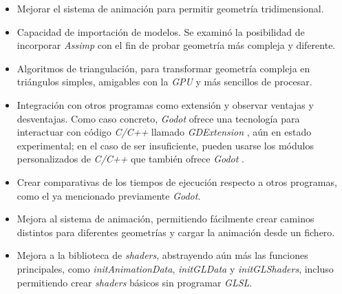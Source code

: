 \begin{itemize}

    \item Mejorar el sistema de animación para permitir geometría tridimensional.

    \item Capacidad de importación de modelos. Se examinó la posibilidad de incorporar \textit{Assimp} con el fin de probar geometría más compleja y diferente.

    \item Algoritmos de triangulación, para transformar geometría compleja en triángulos simples, amigables con la \textit{GPU} y más sencillos de procesar.

    \item Integración con otros programas como extensión y observar ventajas y desventajas. Como caso concreto, \textit{Godot} ofrece una tecnología para interactuar con código \textit{C/C++} llamado \textit{GDExtension} \cite{webGodotGDExtension}, aún en estado experimental; en el caso de ser insuficiente, pueden usarse los módulos personalizados de \textit{C/C++} que también ofrece \textit{Godot} \cite{webGodotCModules}.

    \item Crear comparativas de los tiempos de ejecución respecto a otros programas, como el ya mencionado previamente \textit{Godot}.

    \item Mejora al sistema de animación, permitiendo fácilmente crear caminos distintos para diferentes geometrías y cargar la animación desde un fichero.

    \item Mejora a la biblioteca de \textit{shaders}, abstrayendo aún más las funciones principales, como \textit{initAnimationData}, \textit{initGLData} y \textit{initGLShaders}, incluso permitiendo crear \textit{shaders} básicos sin programar \textit{GLSL}.

\end{itemize}
